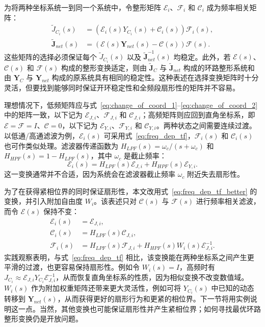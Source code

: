 为将两种坐标系统一到同一个系统中，令整形矩阵 $\mathcal{E}_i$、$\mathcal{F}_i$ 和 $\mathcal{C}_i$ 成为频率相关矩阵：
\begin{equation}
\begin{aligned}
\tilde{J}_{C_i}(s)&=(\mathcal{E}_i(s)Y_{C_i}(s)+\mathcal{C}_i(s))\mathcal{F}_i(s),\\
\tilde{\mathbf{J}}_{net}(s)&=(\boldsymbol{\mathcal{E}}(s)\mathbf{Y}_{net}(s)-\boldsymbol{\mathcal{C}}(s))\boldsymbol{\mathcal{F}}(s).
\end{aligned}
\label{eq:generic_trasnf}
\end{equation}
这些矩阵的选择必须保证每个 $\tilde{J}_{C_i}(s)$ 以及 $\tilde{\mathbf{J}}_{net}^{-1}(s)$ 均稳定。此外，若 $\boldsymbol{\mathcal{E}}(s)$、$\boldsymbol{\mathcal{C}}(s)$ 和 $\boldsymbol{\mathcal{F}}(s)$ 构成的整形变换适定，则由 $\tilde{\mathbf{J}}_C$ 与 $\tilde{\mathbf{J}}_{net}$ 构成的环路整形系统和由 $\mathbf{Y}_C$ 与 $\mathbf{Y}_{net}$ 构成的原系统具有相同的稳定性。这种表述在选择变换矩阵时十分灵活，但要找到能够同时保证开环稳定性和全频段扇形性的矩阵并不容易。

理想情况下，低频矩阵应与式~\eqref{eq:change_of_coord_1}--\eqref{eq:change_of_coord_2} 中的矩阵一致，以下记为 $\mathcal{E}_{J,i}$、$\mathcal{F}_{J,i}$ 和 $\mathcal{C}_{J,i}$；高频矩阵则应回到直角坐标系，即 $\mathcal{E}=\mathcal{F}=I$、$\mathcal{C}=0$，以下记为 $\mathcal{E}_{Y,i}$、$\mathcal{F}_{Y,i}$ 和 $\mathcal{C}_{Y,i}$。两种状态之间需要连续过渡。以低通/高通滤波为例，$\mathcal{E}_i(s)$ 可采用式~\eqref{eq:freq_dep_tf}，$\mathcal{F}_i(s)$ 和 $\mathcal{C}_i(s)$ 也可作类似处理。滤波器传递函数为 $H_{LPF}(s)=\omega_c/(s+\omega_c)$ 和 $H_{HPF}(s)=1-H_{LPF}(s)$，其中 $\omega_c$ 是截止频率：
\begin{equation}
\mathcal{E}_i(s)=H_{LPF}(s)\mathcal{E}_{J,i}+H_{HPF}(s)\mathcal{E}_{Y,i}.
\label{eq:freq_dep_tf}
\end{equation}
这一变换通常并不合适，因为系统会在滤波器截止频率 $\omega_c$ 附近失去扇形性。

为了在获得紧相位界的同时保证扇形性，本文改用式~\eqref{eq:freq_dep_tf_better} 的变换，并引入附加自由度 $W_i$。该表述只对 $\mathcal{C}(s)$ 与 $\mathcal{F}(s)$ 进行频率相关滤波，而令 $\mathcal{E}(s)$ 保持不变：
\begin{equation}
\begin{aligned}
\mathcal{E}_i(s)&=\mathcal{E}_{J,i},\\
\mathcal{C}_i(s)&=H_{LPF}(s)\mathcal{C}_{J,i},\\
\mathcal{F}_i(s)&=H_{LPF}(s)\mathcal{F}_{J,i}
+H_{HPF}(s)W_i(s)\mathcal{E}_{J,i}^{-1}.
\end{aligned}
\label{eq:freq_dep_tf_better}
\end{equation}
实践观察表明，与式~\eqref{eq:freq_dep_tf} 相比，该变换能在两种坐标系之间产生更平滑的过渡，也更容易保持扇形性。例如令 $W_i(s)=I$，高频时有 $J_{C_i}\approx\mathcal{E}_{J,i}Y_{C_i}\mathcal{E}_{J,i}^{-1}$，从而恢复直角坐标系的性质，因为相似变换不改变数值域。$W_i(s)$ 作为附加权重矩阵还带来更大灵活性，例如可将 $Y_{C_i}(s)$ 中已知的动态转移到 $\mathbf{Y}_{net}(s)$，从而获得更好的扇形行为和更紧的相位界。下一节将用实例说明这一点。当然，其他变换也可能保证扇形性并产生紧相位界；如何寻找最优环路整形变换仍是开放问题。
